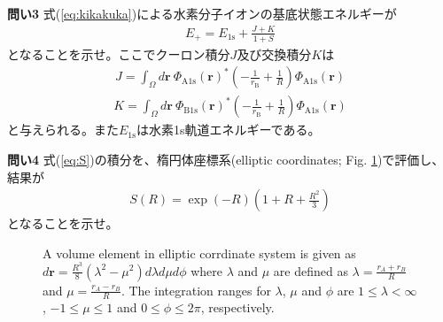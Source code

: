 \documentclass[11pt,pra,aps]{revtex4}
\begin{document}
\noindent
{\bf 問い3} 式(\ref{eq:kikakuka})による水素分子イオンの基底状態エネルギーが
\begin{align}
  E_+=E_\text{1s}+\frac{J+K}{1+S}
\end{align}    
となることを示せ。ここでクーロン積分$J$及び交換積分$K$は
\begin{align}
  J=\int_\Omega d\mathbf{r} \ \Phi_\text{A1s}(\mathbf{r})^{*} \left(-\frac{1}{r_\text{B}}+\frac{1}{R}\right) \Phi_\text{A1s}(\mathbf{r})
\end{align}
\begin{align}
  K=\int_\Omega d\mathbf{r} \ \Phi_\text{B1s}(\mathbf{r})^{*} \left(-\frac{1}{r_\text{B}}+\frac{1}{R}\right) \Phi_\text{A1s}(\mathbf{r})
\end{align}
と与えられる。また$E_\text{1s}$は水素1s軌道エネルギーである。

\noindent
{\bf 問い4} 式(\ref{eq:S})の積分を、楕円体座標系(elliptic coordinates; Fig. \ref{fig:elliptic})で評価し、結果が
\begin{align}
  S(R)=\exp(-R)\left(1+R+\frac{R^2}{3}\right)
\end{align}
となることを示せ。
{
  \begin{figure}[H]
    \begin{center}
    \caption{\label{fig:elliptic}
      {
        A volume element in elliptic corrdinate system is given as $d\mathbf{r}=\frac{R^3}{8}(\lambda^2-\mu^2)d\lambda d\mu d\phi$ where $\lambda$ and $\mu$ are defined as $\lambda=\frac{r_A+r_B}{R}$ and $\mu=\frac{r_A-r_B}{R}$. The integration ranges for $\lambda$, $\mu$ and $\phi$ are $1\leq \lambda<\infty$, $-1\leq\mu\leq 1$ and $0\leq\phi\leq 2\pi$, respectively.
      }
    }
    \end{center}
  \end{figure}
}
\end{document}
